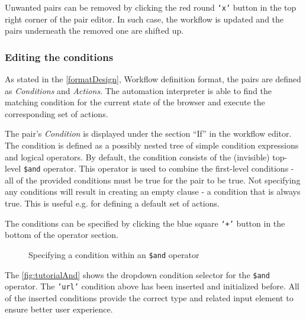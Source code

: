 Unwanted pairs can be removed by clicking the red round \texttt{`x'} button in the top right corner of the pair editor.
In such case, the workflow is updated and the pairs underneath the removed one are shifted up.
\clearpage
\subsubsection{Editing the conditions}

As stated in the \autoref{formatDesign}, Workflow definition format, the pairs are defined as \textit{Conditions} and \textit{Actions}.
The automation interpreter is able to find the matching condition for the current state of the browser and execute the corresponding set of actions.

The pair's \textit{Condition} is displayed under the section ``If'' in the workflow editor.
The condition is defined as a possibly nested tree of simple condition expressions and logical operators.
By default, the condition consists of the (invisible) top-level \texttt{\$and} operator.
This operator is used to combine the first-level conditions - all of the provided conditions must be true for the pair to be true.
Not specifying any conditions will result in creating an empty clause - a condition that is always true.
This is useful e.g. for defining a default set of actions.

The conditions can be specified by clicking the blue square \texttt{`+'} button in the bottom of the operator section.

\begin{figure}[!h]
    \begin{center}
    \end{center}
    \caption{Specifying a condition within an \texttt{\$and} operator} \label{fig:tutorialAnd}
\end{figure}

The \autoref{fig:tutorialAnd} shows the dropdown condition selector for the \texttt{\$and} operator.
The \texttt{'url'} condition above has been inserted and initialized before.
All of the inserted conditions provide the correct type and related input element to ensure better user experience.

